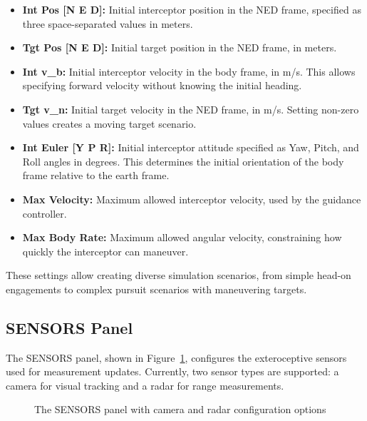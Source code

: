 \documentclass[11pt,a4paper]{article}
\begin{document}
\begin{itemize}
    \item \textbf{Int Pos [N E D]:} Initial interceptor position in the NED frame, specified as three space-separated values in meters.
    
    \item \textbf{Tgt Pos [N E D]:} Initial target position in the NED frame, in meters.
    
    \item \textbf{Int v\_b:} Initial interceptor velocity in the body frame, in m/s. This allows specifying forward velocity without knowing the initial heading.
    
    \item \textbf{Tgt v\_n:} Initial target velocity in the NED frame, in m/s. Setting non-zero values creates a moving target scenario.
    
    \item \textbf{Int Euler [Y P R]:} Initial interceptor attitude specified as Yaw, Pitch, and Roll angles in degrees. This determines the initial orientation of the body frame relative to the earth frame.
    
    \item \textbf{Max Velocity:} Maximum allowed interceptor velocity, used by the guidance controller.
    
    \item \textbf{Max Body Rate:} Maximum allowed angular velocity, constraining how quickly the interceptor can maneuver.
\end{itemize}

These settings allow creating diverse simulation scenarios, from simple head-on engagements to complex pursuit scenarios with maneuvering targets.

\subsection{SENSORS Panel}

The SENSORS panel, shown in Figure~\ref{fig:sensors_panel}, configures the exteroceptive sensors used for measurement updates. Currently, two sensor types are supported: a camera for visual tracking and a radar for range measurements.

\begin{figure}[h]
    \centering
    \caption{The SENSORS panel with camera and radar configuration options}
    \label{fig:sensors_panel}
\end{figure}
\end{document}
